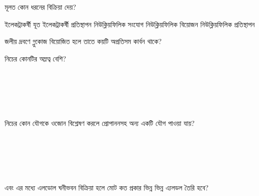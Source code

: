 \documentclass[addpoints]{exam}
\begin{document}
\begin{questions}
\question {}  মূলত কোন ধরনের বিক্রিয়া দেয়?

\begin{oneparchoices}
\choice  ইলেকট্রাকর্ষী যূত 
\choice ইলেকট্রাকর্ষী প্রতিস্থাপন 
\choice নিউক্লিয়ফিলিক সংযোগ 
\choice নিউক্লিয়ফিলিক বিয়োজন 
\choice নিউক্লিয়ফিলিক প্রতিস্থাপন
\end{oneparchoices}

\question   জলীয় দ্রবণে গ্লুকোজ বিয়োজিত হলে তাতে কয়টি অপ্রতিসম কার্বন থাকে?

\begin{oneparchoices}
\end{oneparchoices}

\question  নিচের কোনটির অম্লত্ব বেশি?

\begin{oneparchoices}
\choice {}\\

\choice {}\\

\choice {}\\

\choice {}\\

\choice {}
\end{oneparchoices}

\question  নিচের কোন যৌগকে ওজোন বিশ্লেষণ করলে প্রোপাননসহ অন্য একটি যৌগ পাওয়া যায়?

\begin{oneparchoices}
\choice {}\\

\choice {}\\

\choice {}\\

\choice {}\\

\choice {}
\end{oneparchoices}

\question {} এবং  এর মধ্যে এলডোল ঘনীভবন বিক্রিয়া হলে মোট কত প্রকার ভিন্ন ভিন্ন  এ্যলডল তৈরি হবে?

\begin{oneparchoices}
\end{oneparchoices}


\end{questions}
\end{document}
